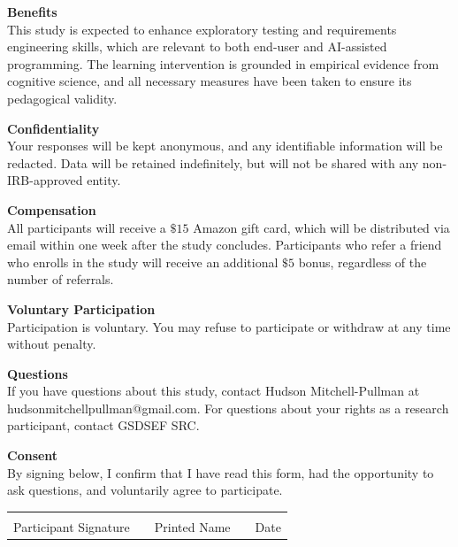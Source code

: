 \documentclass[11pt]{article}
\begin{document}
\vspace{0.8em}

\noindent\textbf{Benefits}\\
This study is expected to enhance exploratory testing and requirements engineering skills, which are relevant to both end-user and AI-assisted programming. The learning intervention is grounded in empirical evidence from cognitive science, and all necessary measures have been taken to ensure its pedagogical validity.

\vspace{0.8em}

\noindent\textbf{Confidentiality}\\
Your responses will be kept anonymous, and any identifiable information will be redacted. Data will be retained indefinitely, but will not be shared with any non-IRB-approved entity.

\vspace{0.8em}

\noindent\textbf{Compensation}\\
All participants will receive a $\$15$ Amazon gift card, which will be distributed via email within one week after the study concludes. Participants who refer a friend who enrolls in the study will receive an additional $\$5$ bonus, regardless of the number of referrals.

\vspace{0.8em}

\noindent\textbf{Voluntary Participation}\\
Participation is voluntary. You may refuse to participate or withdraw at any time without penalty.

\vspace{0.8em}

\noindent\textbf{Questions}\\
If you have questions about this study, contact Hudson Mitchell-Pullman at hudsonmitchellpullman@gmail.com. For questions about your rights as a research participant, contact GSDSEF SRC.

\vspace{1.5em}

\noindent\textbf{Consent}\\
By signing below, I confirm that I have read this form, had the opportunity to ask questions, and voluntarily agree to participate.

\vspace{1.5em}

\noindent\begin{tabular}{@{}p{}p{}p{}p{}p{}@{}}
\hrulefill & & \hrulefill & & \hrulefill \\
Participant Signature & & Printed Name & & Date
\end{tabular}
\end{document}
